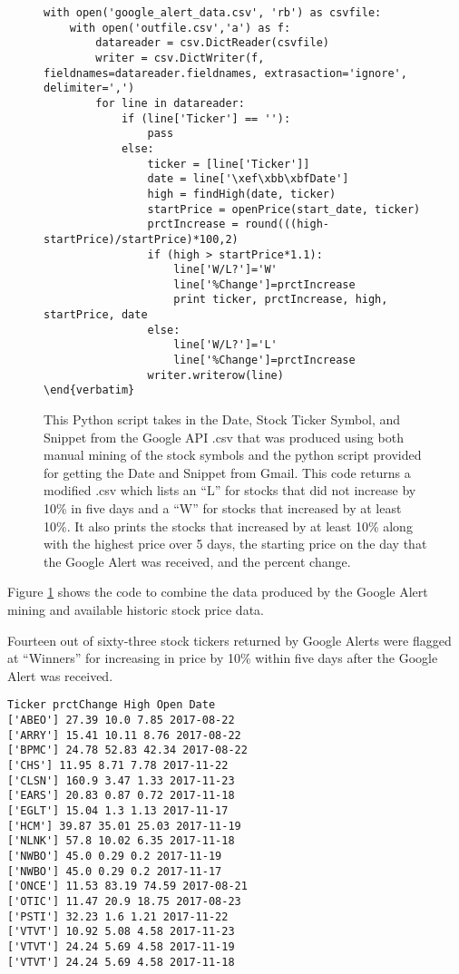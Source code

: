 \documentclass[sigconf]{acmart}
\begin{document}
\begin{figure}[htb]
\begin{lstlisting}
with open('google_alert_data.csv', 'rb') as csvfile:
	with open('outfile.csv','a') as f:
		datareader = csv.DictReader(csvfile)
		writer = csv.DictWriter(f, fieldnames=datareader.fieldnames, extrasaction='ignore', delimiter=',')
		for line in datareader:
			if (line['Ticker'] == ''):
				pass
			else:
				ticker = [line['Ticker']]
				date = line['\xef\xbb\xbfDate']
				high = findHigh(date, ticker)
				startPrice = openPrice(start_date, ticker)
				prctIncrease = round(((high-startPrice)/startPrice)*100,2)
				if (high > startPrice*1.1):
					line['W/L?']='W'
					line['%Change']=prctIncrease
					print ticker, prctIncrease, high, startPrice, date
				else:
					line['W/L?']='L'
					line['%Change']=prctIncrease
				writer.writerow(line) 
\end{verbatim}
\end{lstlisting}
\caption{This Python script takes in the Date, Stock Ticker Symbol, and Snippet from the Google API .csv that was produced using both manual mining of the stock symbols and the python script provided for getting the Date and Snippet from Gmail. This code returns a modified .csv which lists an ``L'' for stocks that did not increase by 10\% in five days and a ``W'' for stocks that increased by at least 10\%. It also prints the stocks that increased by at least 10\% along with the highest price over 5 days, the starting price on the day that the Google Alert was received, and the percent change.}\label{c:stock}
\end{figure}

Figure \ref{c:stock} shows the code to combine the data produced by the Google Alert mining and available historic stock price data.

Fourteen out of sixty-three stock tickers returned by Google Alerts were flagged at ``Winners'' for increasing in price by 10\% within five days after the Google Alert was received. 
\begin{mdframed}[style=default]
\begin{lstlisting}
Ticker prctChange High Open Date
['ABEO'] 27.39 10.0 7.85 2017-08-22
['ARRY'] 15.41 10.11 8.76 2017-08-22
['BPMC'] 24.78 52.83 42.34 2017-08-22
['CHS'] 11.95 8.71 7.78 2017-11-22
['CLSN'] 160.9 3.47 1.33 2017-11-23
['EARS'] 20.83 0.87 0.72 2017-11-18
['EGLT'] 15.04 1.3 1.13 2017-11-17
['HCM'] 39.87 35.01 25.03 2017-11-19
['NLNK'] 57.8 10.02 6.35 2017-11-18
['NWBO'] 45.0 0.29 0.2 2017-11-19
['NWBO'] 45.0 0.29 0.2 2017-11-17
['ONCE'] 11.53 83.19 74.59 2017-08-21
['OTIC'] 11.47 20.9 18.75 2017-08-23
['PSTI'] 32.23 1.6 1.21 2017-11-22
['VTVT'] 10.92 5.08 4.58 2017-11-23
['VTVT'] 24.24 5.69 4.58 2017-11-19
['VTVT'] 24.24 5.69 4.58 2017-11-18
\end{lstlisting}
\end{mdframed}
\end{document}

